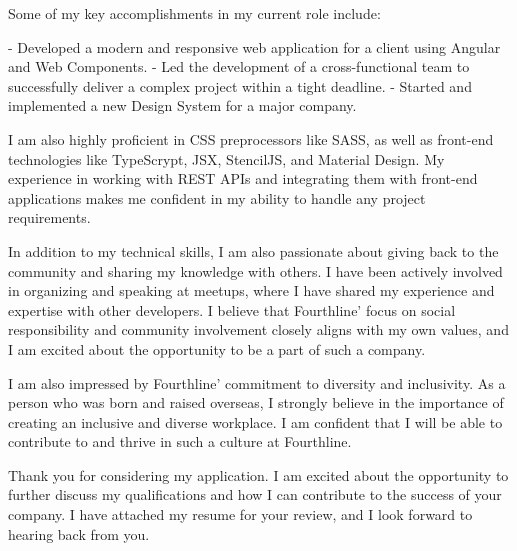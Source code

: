 \documentclass[11pt, a4paper]{awesome-cv}
\begin{document}
\begin{cvletter}
Some of my key accomplishments in my current role include:

- Developed a modern and responsive web application for a client using Angular and Web Components.
- Led the development of a cross-functional team to successfully deliver a complex project within a tight deadline.
- Started and implemented a new Design System for a major company.

I am also highly proficient in CSS preprocessors like SASS, as well as front-end technologies like TypeScrypt, JSX, StencilJS, and Material Design. My experience in working with REST APIs and integrating them with front-end applications makes me confident in my ability to handle any project requirements.

In addition to my technical skills, I am also passionate about giving back to the community and sharing my knowledge with others. I have been actively involved in organizing and speaking at meetups, where I have shared my experience and expertise with other developers. I believe that Fourthline’ focus on social responsibility and community involvement closely aligns with my own values, and I am excited about the opportunity to be a part of such a company.

I am also impressed by Fourthline’ commitment to diversity and inclusivity. As a person who was born and raised overseas, I strongly believe in the importance of creating an inclusive and diverse workplace. I am confident that I will be able to contribute to and thrive in such a culture at Fourthline.

Thank you for considering my application. I am excited about the opportunity to further discuss my qualifications and how I can contribute to the success of your company. I have attached my resume for your review, and I look forward to hearing back from you.

\end{cvletter}


\makeletterclosing
\end{document}
